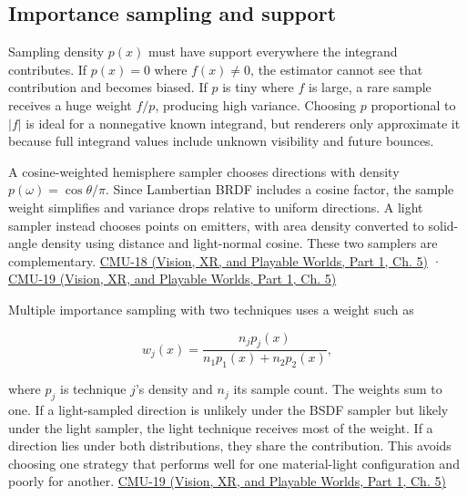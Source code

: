 \subsection{Importance sampling and support}\label{03-visual-computing-i-ch012-importance-sampling-and-support}

\hypertarget{03-visual-computing-i-ch012-importance-sampling-and-support}{}

Sampling density \(p(x)\) must have support everywhere the integrand contributes. If \(p(x)=0\) where \(f(x)\ne0\), the estimator cannot see that contribution and becomes biased. If \(p\) is tiny where \(f\) is large, a rare sample receives a huge weight \(f/p\), producing high variance. Choosing \(p\) proportional to \(|f|\) is ideal for a nonnegative known integrand, but renderers only approximate it because full integrand values include unknown visibility and future bounces.

A cosine-weighted hemisphere sampler chooses directions with density \(p(\omega)=\cos\theta/\pi\). Since Lambertian BRDF includes a cosine factor, the sample weight simplifies and variance drops relative to uniform directions. A light sampler instead chooses points on emitters, with area density converted to solid-angle density using distance and light-normal cosine. These two samplers are complementary. \href{../07-Vision-XR-and-Playable-Worlds-P01/main.pdf\#04-visual-computing-ii-ch036-cmu-18---monte-carlo-rendering}{CMU-18 (Vision, XR, and Playable Worlds, Part 1, Ch. 5)} · \href{../07-Vision-XR-and-Playable-Worlds-P01/main.pdf\#04-visual-computing-ii-ch036-cmu-19---variance-reduction}{CMU-19 (Vision, XR, and Playable Worlds, Part 1, Ch. 5)}

Multiple importance sampling with two techniques uses a weight such as

\[
w_j(x)=\frac{n_jp_j(x)}{n_1p_1(x)+n_2p_2(x)},
\]

where \(p_j\) is technique \(j\)'s density and \(n_j\) its sample count. The weights sum to one. If a light-sampled direction is unlikely under the BSDF sampler but likely under the light sampler, the light technique receives most of the weight. If a direction lies under both distributions, they share the contribution. This avoids choosing one strategy that performs well for one material-light configuration and poorly for another. \href{../07-Vision-XR-and-Playable-Worlds-P01/main.pdf\#04-visual-computing-ii-ch036-cmu-19---variance-reduction}{CMU-19 (Vision, XR, and Playable Worlds, Part 1, Ch. 5)}

